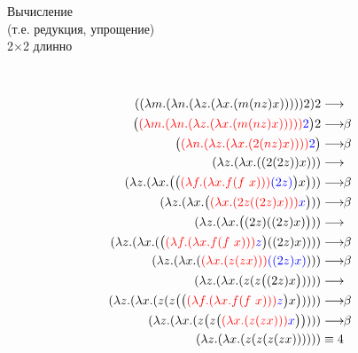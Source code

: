 \begin{frame}[plain]{Вычисление \\(т.е. редукция, упрощение) \\2$\times$2 длинно}
\def\betaarr{\longrightarrow\!\!\beta}
\def\numTWO{\ensuremath{\lam{f}{\lam{x}{f(f\ x)}}}}
\setcounter{equation}{0}
\begin{figure}[t]
  \begin{subfigure}[t]{0.35\textwidth}
  $\qquad$
  \end{subfigure}
  \begin{subfigure}[t]{0.55\textwidth}
        \vspace{-8em}

        {  \begin{align}
          \apppl{\app{\lam{m}{\lam{n}{\lam{z}{\lam{x}{(m \app{n}{z} x)}}}}}{2}}{2} & \longrightarrow \\
          \Apppl{\Redex{\lam{m}{\lam{n}{\lam{z}{\lam{x}{(m \app{n}{z} x)}}}}}{2}}{2} & \betaarr \\
          \Redex{\lam{n}{\lam{z}{\lam{x}{(2 \app{n}{z} x)}}}}{2} & \betaarr \\
          \lam{z}{\lam{x}{\app{\app{2}{\app{2}{z}}}{x}}} & \longrightarrow \\
          \lam{z}{\lam{x}{\App{\Redex{\numTWO}{\app{2}{z}}}{x}}} & \betaarr \\
          \lam{z}{\lam{x}{\Redex{\lam{x}{(2 z (\app{2}{z} x))}}{x}}} & \betaarr \\
          \lam{z}{\lam{x}{\App{\app{2}{z}}{(\app{2}{z} x)}}} & \longrightarrow \\
          \lam{z}{\lam{x}{\app{\Redex{\numTWO}{z}}{(\app{2}{z} x)}}} & \betaarr \\
          \lam{z}{\lam{x}{\redex{\lam{x}{\app{z}{\app{z}{x}}}}{(\app{2}{z} x)}}} & \betaarr \\
          \lam{z}{\lam{x}{\app{z}{\app{z}{\App{\app{2}{z}}{x}}}}} & \longrightarrow \\
          \lam{z}{\lam{x}{\app{z}{\app{z}{\App{\Redex{\numTWO}{z}}{x}}}}} & \betaarr \\
          \lam{z}{\lam{x}{\app{z}{\App{z}{\Redex{\lam{x}{\app{z}{\app{z}{x}}}}{x}}}}} & \betaarr \\
          \lam{z}{\lam{x}{\app{z}{\app{z}{\app{z}{\app{z}{x}}}}}} & \equiv 4
        \end{align}}
  \end{subfigure}
\end{figure}

\end{frame}

